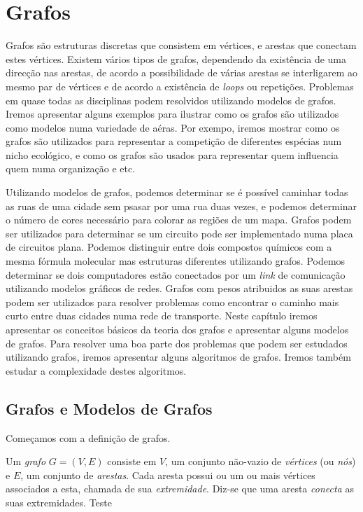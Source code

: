 \chapter{Grafos}
\label{cap:grafos}

Grafos são estruturas discretas que consistem em vértices, e arestas que
conectam estes vértices. Existem vários tipos de grafos, dependendo da
existência de uma direcção nas arestas, de acordo a possibilidade de várias
arestas se interligarem ao mesmo par de vértices e de acordo a existência de
\emph{loops} ou repetições.
Problemas em quase todas as disciplinas podem resolvidos utilizando modelos de
grafos. Iremos apresentar alguns exemplos para ilustrar como os grafos são
utilizados como modelos numa variedade de aéras. Por exempo, iremos mostrar como
os grafos são utilizados para representar a competição de diferentes espécias
num nicho ecológico, e como os grafos são usados para representar quem
influencia quem numa organização e etc.

Utilizando modelos de grafos, podemos determinar se é possível caminhar todas as
ruas de uma cidade sem psasar por uma rua duas vezes, e podemos determinar o
número de cores necessário para colorar as regiões de um mapa. Grafos podem ser
utilizados para determinar se um circuito pode ser implementado numa placa de
circuitos plana. Podemos distinguir entre dois compostos químicos com a mesma
fórmula molecular mas estruturas diferentes utilizando grafos. Podemos
determinar se dois computadores estão conectados por um \emph{link} de
comunicação utilizando modelos gráficos de redes. Grafos com pesos atribuidos as
suas arestas podem ser utilizados para resolver problemas como encontrar o
caminho mais curto entre duas cidades numa rede de transporte. Neste capítulo
iremos apresentar os conceitos básicos da teoria dos grafos e apresentar alguns
modelos de grafos. Para resolver uma boa parte dos problemas que podem ser
estudados utilizando grafos, iremos apresentar alguns algoritmos de grafos.
Iremos também estudar a complexidade destes algoritmos.

\section{Grafos e Modelos de Grafos}

Começamos com a definição de grafos.
\begin{defn}
\label{def51}
Um \emph{grafo} $G = (V,E)$ consiste em $V$, um conjunto não-vazio de
\emph{vértices} (ou \emph{nós}) e $E$, um conjunto de \emph{arestas}. Cada
aresta possui ou um ou mais vértices associados a esta, chamada de sua
\emph{extremidade}. Diz-se que uma aresta \emph{conecta} as suas extremidades.
Teste
\end{defn}
